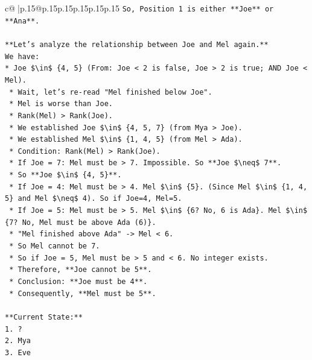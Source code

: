 \documentclass{article}
\begin{document}
{\begin{supertabular}{c@{$\;$}|p{.15\linewidth}@{}p{.15\linewidth}p{.15\linewidth}p{.15\linewidth}p{.15\linewidth}p{.15\linewidth}}
{{{\texttt{So, Position 1 is either **Joe** or **Ana**.} \\
\\ 
\texttt{**Let's analyze the relationship between Joe and Mel again.**} \\
\texttt{We have:} \\
\texttt{*   Joe \$\textbackslash{}in\$ \{4, 5\} (From: Joe < 2 is false, Joe > 2 is true; AND Joe < Mel).} \\
\texttt{    *   Wait, let's re{-}read "Mel finished below Joe".} \\
\texttt{    *   Mel is worse than Joe.} \\
\texttt{    *   Rank(Mel) > Rank(Joe).} \\
\texttt{    *   We established Joe \$\textbackslash{}in\$ \{4, 5, 7\} (from Mya > Joe).} \\
\texttt{    *   We established Mel \$\textbackslash{}in\$ \{1, 4, 5\} (from Mel > Ada).} \\
\texttt{    *   Condition: Rank(Mel) > Rank(Joe).} \\
\texttt{    *   If Joe = 7: Mel must be > 7. Impossible. So **Joe \$\textbackslash{}neq\$ 7**.} \\
\texttt{    *   So **Joe \$\textbackslash{}in\$ \{4, 5\}**.} \\
\texttt{    *   If Joe = 4: Mel must be > 4. Mel \$\textbackslash{}in\$ \{5\}. (Since Mel \$\textbackslash{}in\$ \{1, 4, 5\} and Mel \$\textbackslash{}neq\$ 4). So if Joe=4, Mel=5.} \\
\texttt{    *   If Joe = 5: Mel must be > 5. Mel \$\textbackslash{}in\$ \{6? No, 6 is Ada\}. Mel \$\textbackslash{}in\$ \{7? No, Mel must be above Ada (6)\}.} \\
\texttt{        *   "Mel finished above Ada" {-}> Mel < 6.} \\
\texttt{        *   So Mel cannot be 7.} \\
\texttt{        *   So if Joe = 5, Mel must be > 5 and < 6. No integer exists.} \\
\texttt{        *   Therefore, **Joe cannot be 5**.} \\
\texttt{    *   Conclusion: **Joe must be 4**.} \\
\texttt{    *   Consequently, **Mel must be 5**.} \\
\\ 
\texttt{**Current State:**} \\
\texttt{1.  ?} \\
\texttt{2.  Mya} \\
\texttt{3.  Eve} \\
}}}
\end{supertabular}}
\end{document}
